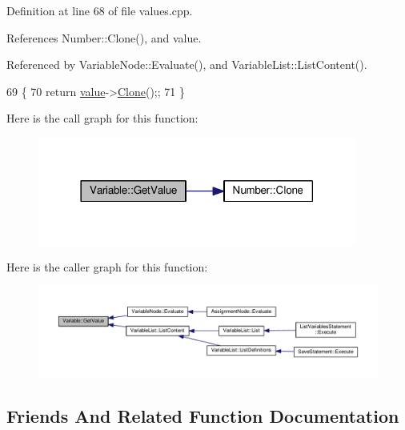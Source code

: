 Definition at line 68 of file values.\+cpp.



References Number\+::\+Clone(), and value.



Referenced by Variable\+Node\+::\+Evaluate(), and Variable\+List\+::\+List\+Content().


\begin{DoxyCode}
69 \{
70     \textcolor{keywordflow}{return} \hyperlink{classVariable_a97f7747dc30797f29b247e26ca585c94}{value}->\hyperlink{structNumber_af59101b8a549616be51212fa1c17785e}{Clone}();;
71 \}
\end{DoxyCode}


Here is the call graph for this function\+:
\nopagebreak
\begin{figure}[H]
\begin{center}
\leavevmode
\includegraphics[width=297pt]{d6/d1c/classVariable_adb77b2681374245b5d606a1d149d0d91_cgraph}
\end{center}
\end{figure}




Here is the caller graph for this function\+:
\nopagebreak
\begin{figure}[H]
\begin{center}
\leavevmode
\includegraphics[width=350pt]{d6/d1c/classVariable_adb77b2681374245b5d606a1d149d0d91_icgraph}
\end{center}
\end{figure}




\subsection{Friends And Related Function Documentation}
